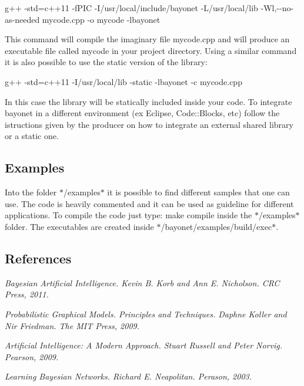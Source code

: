 {\ttfamily g++ -\/std=c++11 -\/f\-P\-I\-C -\/\-I/usr/local/include/bayonet -\/\-L/usr/local/lib -\/\-Wl,-\/-\/no-\/as-\/needed mycode.\-cpp -\/o mycode -\/lbayonet}

This command will compile the imaginary file mycode.\-cpp and will produce an executable file called mycode in your project directory. Using a similar command it is also possible to use the static version of the library\-:

{\ttfamily g++ -\/std=c++11 -\/\-I/usr/local/lib -\/static -\/lbayonet -\/c mycode.\-cpp}

In this case the library will be statically included inside your code. To integrate bayonet in a different environment (ex Eclipse, Code\-::\-Blocks, etc) follow the istructions given by the producer on how to integrate an external shared library or a static one.

\subsection*{Examples }

Into the folder $\ast$/examples$\ast$ it is possible to find different samples that one can use. The code is heavily commented and it can be used as guideline for different applications. To compile the code just type\-: {\ttfamily make compile} inside the $\ast$/examples$\ast$ folder. The executables are created inside $\ast$/bayonet/examples/build/exec$\ast$.

\subsection*{References }


\begin{DoxyItemize}
\item {\itshape Bayesian Artificial Intelligence. Kevin B. Korb and Ann E. Nicholson. C\-R\-C Press, 2011.}
\item {\itshape Probabilistic Graphical Models. Principles and Techniques. Daphne Koller and Nir Friedman. The M\-I\-T Press, 2009.}
\item {\itshape Artificial Intelligence\-: A Modern Approach. Stuart Russell and Peter Norvig. Pearson, 2009.}
\item {\itshape Learning Bayesian Networks. Richard E. Neapolitan. Perason, 2003.} 
\end{DoxyItemize}